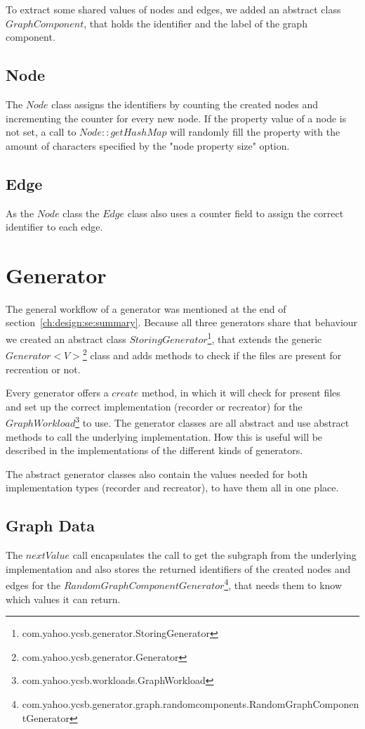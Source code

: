 To extract some shared values of nodes and edges,
we added an abstract class $ GraphComponent $,
that holds the identifier and the label of the graph component.

\subsection{Node}
The $ Node $ class assigns the identifiers by counting the created nodes and incrementing the counter for every new node.
If the property value of a node is not set,
a call to $ Node::getHashMap $ will randomly fill the property with the amount of characters specified by the "node property size" option.

\subsection{Edge}
As the $ Node $ class the $ Edge $ class also uses a counter field to assign the correct identifier to each edge.

\section{Generator}
\label{ch:implementation:se:generator}
The general workflow of a generator was mentioned at the end of section~\ref{ch:design:se:summary}.
Because all three generators share that behaviour we created an abstract class $ StoringGenerator $\footnote{com.yahoo.ycsb.generator.StoringGenerator},
that extends the generic $ Generator<V> $\footnote{com.yahoo.ycsb.generator.Generator} class and adds methods to check if the files are present for recreation or not.

Every generator offers a $ create $ method,
in which it will check for present files and set up the correct implementation (recorder or recreator) for the $ GraphWorkload $\footnote{com.yahoo.ycsb.workloads.GraphWorkload} to use.
The generator classes are all abstract and use abstract methods to call the underlying implementation.
How this is useful will be described in the implementations of the different kinds of generators.

The abstract generator classes also contain the values needed for both implementation types (recorder and recreator),
to have them all in one place.

\subsection{Graph Data}
The $ nextValue $ call encapsulates the call to get the subgraph from the underlying implementation and also stores the returned identifiers of the created nodes and edges for the $ RandomGraphComponentGenerator $\footnote{com.yahoo.ycsb.generator.graph.randomcomponents.RandomGraphComponentGenerator},
that needs them to know which values it can return.

